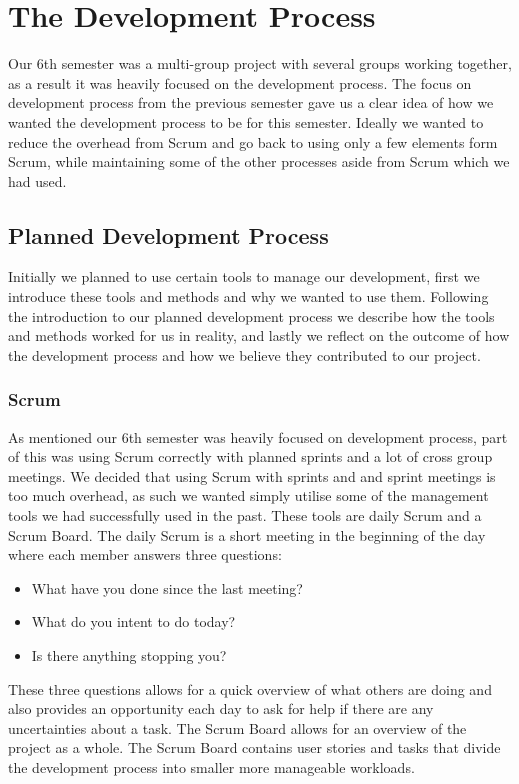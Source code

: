 \section{The Development Process}
Our 6th semester was a multi-group project with several groups working together, as a result it was heavily focused on the development process.
The focus on development process from the previous semester gave us a clear idea of how we wanted the development process to be for this semester.
Ideally we wanted to reduce the overhead from Scrum and go back to using only a few elements form Scrum, while maintaining some of the other processes aside from Scrum which we had used.
\subsection{Planned Development Process}
Initially we planned to use certain tools to manage our development, first we introduce these tools and methods and why we wanted to use them.
Following the introduction to our planned development process we describe how the tools and methods worked for us in reality, and lastly we reflect on the outcome of how the development process and how we believe they contributed to our project.
\subsubsection{Scrum}
As mentioned our 6th semester was heavily focused on development process, part of this was using Scrum correctly with planned sprints and a lot of cross group meetings.
We decided that using Scrum with sprints and and sprint meetings is too much overhead, as such we wanted simply utilise some of the management tools we had successfully used in the past.
These tools are daily Scrum and a Scrum Board.
The daily Scrum is a short meeting in the beginning of the day where each member answers three questions:
\begin{itemize}
    \item What have you done since the last meeting?
    \item What do you intent to do today?
    \item Is there anything stopping you?
\end{itemize}
These three questions allows for a quick overview of what others are doing and also provides an opportunity each day to ask for help if there are any uncertainties about a task.
The Scrum Board allows for an overview of the project as a whole.
The Scrum Board contains user stories and tasks that divide the development process into smaller more manageable workloads.

